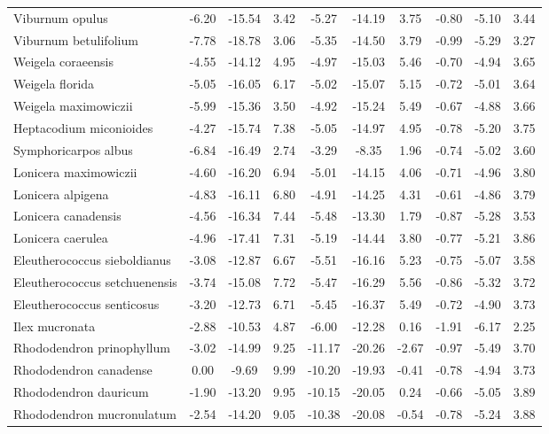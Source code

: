 \documentclass[11pt]{article}
\begin{document}
\begin{longtable}{p{1.50in}c{0.32in}c{0.32in}c{0.32in}c{0.32in}c{0.32in}c{0.32in}c{0.2in}c{0.3in}c{0.1in}}
  Viburnum opulus & -6.20 & -15.54 & 3.42 & -5.27 & -14.19 & 3.75 & -0.80 & -5.10 & 3.44 \\ 
  Viburnum betulifolium & -7.78 & -18.78 & 3.06 & -5.35 & -14.50 & 3.79 & -0.99 & -5.29 & 3.27 \\ 
  Weigela coraeensis & -4.55 & -14.12 & 4.95 & -4.97 & -15.03 & 5.46 & -0.70 & -4.94 & 3.65 \\ 
  Weigela florida & -5.05 & -16.05 & 6.17 & -5.02 & -15.07 & 5.15 & -0.72 & -5.01 & 3.64 \\ 
  Weigela maximowiczii & -5.99 & -15.36 & 3.50 & -4.92 & -15.24 & 5.49 & -0.67 & -4.88 & 3.66 \\ 
  Heptacodium miconioides & -4.27 & -15.74 & 7.38 & -5.05 & -14.97 & 4.95 & -0.78 & -5.20 & 3.75 \\ 
  Symphoricarpos albus & -6.84 & -16.49 & 2.74 & -3.29 & -8.35 & 1.96 & -0.74 & -5.02 & 3.60 \\ 
  Lonicera maximowiczii & -4.60 & -16.20 & 6.94 & -5.01 & -14.15 & 4.06 & -0.71 & -4.96 & 3.80 \\ 
  Lonicera alpigena & -4.83 & -16.11 & 6.80 & -4.91 & -14.25 & 4.31 & -0.61 & -4.86 & 3.79 \\ 
  Lonicera canadensis & -4.56 & -16.34 & 7.44 & -5.48 & -13.30 & 1.79 & -0.87 & -5.28 & 3.53 \\ 
  Lonicera caerulea & -4.96 & -17.41 & 7.31 & -5.19 & -14.44 & 3.80 & -0.77 & -5.21 & 3.86 \\ 
  Eleutherococcus sieboldianus & -3.08 & -12.87 & 6.67 & -5.51 & -16.16 & 5.23 & -0.75 & -5.07 & 3.58 \\ 
  Eleutherococcus setchuenensis & -3.74 & -15.08 & 7.72 & -5.47 & -16.29 & 5.56 & -0.86 & -5.32 & 3.72 \\ 
  Eleutherococcus senticosus & -3.20 & -12.73 & 6.71 & -5.45 & -16.37 & 5.49 & -0.72 & -4.90 & 3.73 \\ 
  Ilex mucronata & -2.88 & -10.53 & 4.87 & -6.00 & -12.28 & 0.16 & -1.91 & -6.17 & 2.25 \\ 
  Rhododendron prinophyllum & -3.02 & -14.99 & 9.25 & -11.17 & -20.26 & -2.67 & -0.97 & -5.49 & 3.70 \\ 
  Rhododendron canadense & 0.00 & -9.69 & 9.99 & -10.20 & -19.93 & -0.41 & -0.78 & -4.94 & 3.73 \\ 
  Rhododendron dauricum & -1.90 & -13.20 & 9.95 & -10.15 & -20.05 & 0.24 & -0.66 & -5.05 & 3.89 \\ 
  Rhododendron mucronulatum & -2.54 & -14.20 & 9.05 & -10.38 & -20.08 & -0.54 & -0.78 & -5.24 & 3.88 \\ 

\end{longtable}
\end{document}
